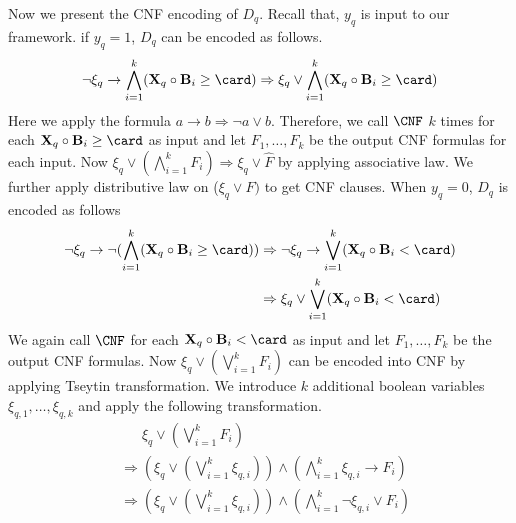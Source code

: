 	Now we present the CNF encoding of $ D_q $. 
	Recall that, $ y_q $ is input to our framework.  if $ y_q=1 $, $ D_q $ can be encoded as follows.
	\[ \neg \xi_q \rightarrow \bigwedge_{i=1}^{k} ({\mathbf{X}_q} \circ {\mathbf{B}_i \ge \card }) \Rightarrow  \xi_q \vee \bigwedge_{i=1}^{k} ({\mathbf{X}_q} \circ {\mathbf{B}_i \ge \card }) \]
	 Here we apply the formula $ a \rightarrow b \Rightarrow \neg a \vee b $.   Therefore, we call $ \CNF $ $ k $ times for each  $ {\mathbf{X}_q} \circ {\mathbf{B}_i \ge \card } $ as input and let $ F_1, \dots, F_k $ be the output CNF formulas for each input. Now $ \xi_q \vee (\bigwedge_{i=1}^k  F_i) \Rightarrow \xi_q \vee   \hat{F}  $ by applying associative law. We further apply 
	 distributive law on  ($ \xi_q \vee \hat{F})  $ to get CNF clauses.
	 When $ y_q = 0 $, $ D_q $ is encoded as follows 
	  \[ 
	  \begin{split}
	  \neg \xi_q \rightarrow \neg (\bigwedge_{i=1}^{k} ({\mathbf{X}_q} \circ {\mathbf{B}_i \ge \card })) 
	  &\Rightarrow \neg \xi_q \rightarrow \bigvee_{i=1}^{k} ({\mathbf{X}_q} \circ {\mathbf{B}_i < \card })\\
	   &\Rightarrow  \xi_q \vee \bigvee_{i=1}^{k} ({\mathbf{X}_q} \circ {\mathbf{B}_i < \card })
	  \end{split}
	   \]
	   We again call $ \CNF $ for each $ {\mathbf{X}_q} \circ {\mathbf{B}_i < \card } $ as input  and  let $ F_1, \dots, F_k $ be the  output CNF formulas. Now $ \xi_q \vee ( \bigvee_{i=1}^k F_i) $ can be encoded into CNF by applying Tseytin transformation. We introduce $ k $ additional boolean variables  $ \xi_{q,1}, \dots, \xi_{q,k}   $  and apply the following transformation. 
	   \[ 
	   \begin{split}
	   &\quad\;\; \xi_q \vee ( \bigvee_{i=1}^k F_i)\\
	   &\Rightarrow (\xi_q \vee (\bigvee_{i=1}^k \xi_{q,i})) \wedge (\bigwedge_{i=1}^k \xi_{q,i} \rightarrow F_i) \\
	   &\Rightarrow (\xi_q \vee (\bigvee_{i=1}^k \xi_{q,i})) \wedge (\bigwedge_{i=1}^k \neg \xi_{q,i} \vee F_i) 
	   \end{split} \]
	
